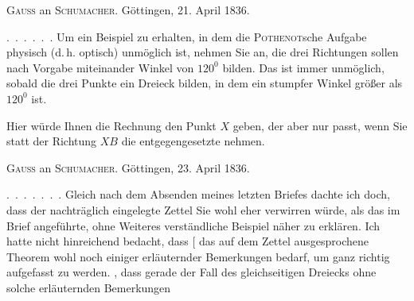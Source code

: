 
\begin{center}
\textsc{Gauss} an \textsc{Schumacher}. Göttingen, 21. April 1836.
\end{center}

\indent \mbox{. . . . . .} Um ein Beispiel zu erhalten, in dem die \textsc{Pothenot}sche Aufgabe physisch (d.\,h. optisch) unmöglich ist, nehmen Sie an, die drei Richtungen sollen nach Vorgabe miteinander Winkel von $120^0$ bilden. Das ist immer unmöglich, sobald die drei Punkte ein Dreieck bilden, in dem ein stumpfer Winkel größer als $120^0$ ist.

\begin{center}\end{center}

Hier würde Ihnen die Rechnung den Punkt $X$ geben, der aber nur passt, wenn Sie statt der Richtung $XB$ die entgegengesetzte nehmen.

\begin{center}
\textsc{Gauss} an \textsc{Schumacher}. Göttingen, 23. April 1836.
\end{center}

\indent \mbox{. . . . . . .} Gleich nach dem Absenden meines letzten Briefes dachte ich doch, dass der nachträglich eingelegte Zettel Sie wohl eher verwirren würde, als das im Brief angeführte, ohne Weiteres verständliche Beispiel näher zu erklären. Ich hatte nicht hinreichend bedacht, dass [ das auf dem Zettel ausgesprochene  Theorem wohl noch einiger erläuternder Bemerkungen bedarf, um ganz richtig aufgefasst zu werden. , dass gerade der Fall des gleichseitigen Dreiecks ohne solche erläuternden Bemerkungen\space%
